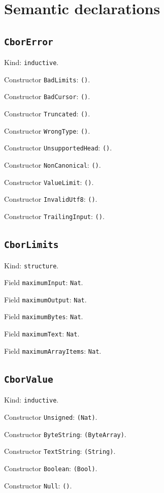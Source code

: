 \documentclass[11pt]{article}
\begin{document}
\section*{Semantic declarations}
\subsection*{\texttt{CborError}}
\noindent Kind: \texttt{inductive}.\par
\noindent Constructor \texttt{BadLimits}: \texttt{()}.\par
\noindent Constructor \texttt{BadCursor}: \texttt{()}.\par
\noindent Constructor \texttt{Truncated}: \texttt{()}.\par
\noindent Constructor \texttt{WrongType}: \texttt{()}.\par
\noindent Constructor \texttt{UnsupportedHead}: \texttt{()}.\par
\noindent Constructor \texttt{NonCanonical}: \texttt{()}.\par
\noindent Constructor \texttt{ValueLimit}: \texttt{()}.\par
\noindent Constructor \texttt{InvalidUtf8}: \texttt{()}.\par
\noindent Constructor \texttt{TrailingInput}: \texttt{()}.\par
\subsection*{\texttt{CborLimits}}
\noindent Kind: \texttt{structure}.\par
\noindent Field \texttt{maximumInput}: \texttt{Nat}.\par
\noindent Field \texttt{maximumOutput}: \texttt{Nat}.\par
\noindent Field \texttt{maximumBytes}: \texttt{Nat}.\par
\noindent Field \texttt{maximumText}: \texttt{Nat}.\par
\noindent Field \texttt{maximumArrayItems}: \texttt{Nat}.\par
\subsection*{\texttt{CborValue}}
\noindent Kind: \texttt{inductive}.\par
\noindent Constructor \texttt{Unsigned}: \texttt{(Nat)}.\par
\noindent Constructor \texttt{ByteString}: \texttt{(ByteArray)}.\par
\noindent Constructor \texttt{TextString}: \texttt{(String)}.\par
\noindent Constructor \texttt{Boolean}: \texttt{(Bool)}.\par
\noindent Constructor \texttt{Null}: \texttt{()}.\par
\end{document}
